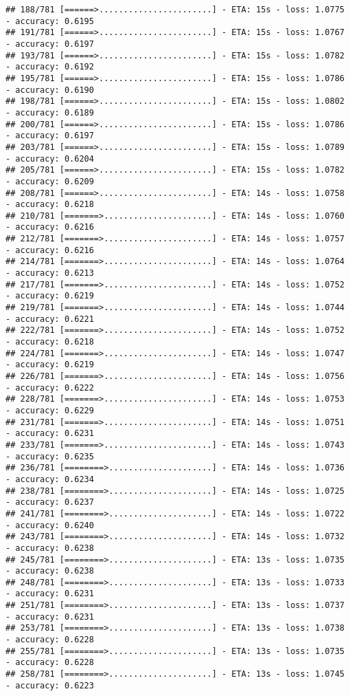 \documentclass[
]{article}
\begin{document}
\begin{verbatim}
## 188/781 [======>.......................] - ETA: 15s - loss: 1.0775 - accuracy: 0.6195
## 191/781 [======>.......................] - ETA: 15s - loss: 1.0767 - accuracy: 0.6197
## 193/781 [======>.......................] - ETA: 15s - loss: 1.0782 - accuracy: 0.6192
## 195/781 [======>.......................] - ETA: 15s - loss: 1.0786 - accuracy: 0.6190
## 198/781 [======>.......................] - ETA: 15s - loss: 1.0802 - accuracy: 0.6189
## 200/781 [======>.......................] - ETA: 15s - loss: 1.0786 - accuracy: 0.6197
## 203/781 [======>.......................] - ETA: 15s - loss: 1.0789 - accuracy: 0.6204
## 205/781 [======>.......................] - ETA: 15s - loss: 1.0782 - accuracy: 0.6209
## 208/781 [======>.......................] - ETA: 14s - loss: 1.0758 - accuracy: 0.6218
## 210/781 [=======>......................] - ETA: 14s - loss: 1.0760 - accuracy: 0.6216
## 212/781 [=======>......................] - ETA: 14s - loss: 1.0757 - accuracy: 0.6216
## 214/781 [=======>......................] - ETA: 14s - loss: 1.0764 - accuracy: 0.6213
## 217/781 [=======>......................] - ETA: 14s - loss: 1.0752 - accuracy: 0.6219
## 219/781 [=======>......................] - ETA: 14s - loss: 1.0744 - accuracy: 0.6221
## 222/781 [=======>......................] - ETA: 14s - loss: 1.0752 - accuracy: 0.6218
## 224/781 [=======>......................] - ETA: 14s - loss: 1.0747 - accuracy: 0.6219
## 226/781 [=======>......................] - ETA: 14s - loss: 1.0756 - accuracy: 0.6222
## 228/781 [=======>......................] - ETA: 14s - loss: 1.0753 - accuracy: 0.6229
## 231/781 [=======>......................] - ETA: 14s - loss: 1.0751 - accuracy: 0.6231
## 233/781 [=======>......................] - ETA: 14s - loss: 1.0743 - accuracy: 0.6235
## 236/781 [========>.....................] - ETA: 14s - loss: 1.0736 - accuracy: 0.6234
## 238/781 [========>.....................] - ETA: 14s - loss: 1.0725 - accuracy: 0.6237
## 241/781 [========>.....................] - ETA: 14s - loss: 1.0722 - accuracy: 0.6240
## 243/781 [========>.....................] - ETA: 14s - loss: 1.0732 - accuracy: 0.6238
## 245/781 [========>.....................] - ETA: 13s - loss: 1.0735 - accuracy: 0.6238
## 248/781 [========>.....................] - ETA: 13s - loss: 1.0733 - accuracy: 0.6231
## 251/781 [========>.....................] - ETA: 13s - loss: 1.0737 - accuracy: 0.6231
## 253/781 [========>.....................] - ETA: 13s - loss: 1.0738 - accuracy: 0.6228
## 255/781 [========>.....................] - ETA: 13s - loss: 1.0735 - accuracy: 0.6228
## 258/781 [========>.....................] - ETA: 13s - loss: 1.0745 - accuracy: 0.6223

\end{verbatim}
\end{document}
